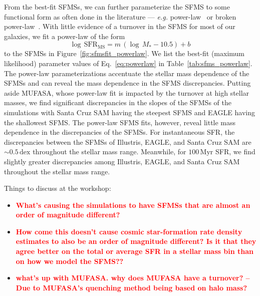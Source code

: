 \documentclass[preprint2,tighten]{aastex62}
\newcommand{\todo}[1]{{\bf \textcolor{red}{ #1}}}
\begin{document}
From the best-fit SFMSs, we can further 
parameterize the SFMS to some functional form as often done in the 
literature --- \emph{e.g.} power-law~\citep{speagle2014} or broken 
power-law~\citep{lee2015}. With little evidence of a turnover in the 
SFMS for most of our galaxies, we fit a power-law of the form 
\begin{equation} \label{eq:powerlaw}
\log\,\mathrm{SFR}_\mathrm{MS} = m\,(\log\,M_* - 10.5) + b
\end{equation}
to the SFMSs in Figure~\ref{fig:sfmsfit_powerlaw}. We list the best-fit 
(maximum likelihood) parameter values of Eq.~\ref{eq:powerlaw} in 
Table~\ref{tab:sfms_powerlaw}. The power-law parameterizations accentuate 
the stellar mass dependence of the SFMSs and can reveal the mass dependence 
in the SFMS discrepancies. Putting aside MUFASA, whose power-law fit is 
impacted by the turnover at high stellar masses, we find significant
discrepancies in the slopes of the SFMSs of the simulations with Santa Cruz 
SAM having the steepest SFMS and EAGLE having the shallowest SFMS. The 
power-law SFMS fits, however, reveal little 
mass dependence in the discrepancies of the SFMSs. For instantaneous SFR, 
the discrepancies between the SFMSs of Illustris, EAGLE, and Santa Cruz SAM are 
$\sim 0.5\,\mathrm{dex}$ throughout the stellar mass range. Meanwhile, 
for $100\,\mathrm{Myr}$ SFR, we find slightly
greater discrepancies among Illustris, EAGLE, and Santa Cruz SAM throughout
the stellar mass range.

Things to discuss at the workshop: 
\begin{itemize}
\item \todo{What's causing the simulations to have SFMSs that are almost an 
order of magnitude different?} 
\item \todo{How come this doesn't cause cosmic star-formation rate 
density estimates to also be an order of magnitude different? Is it that they agree better on the total or average SFR in a stellar mass bin than on how we model the SFMS??}
\item \todo{what's up with MUFASA. why does MUFASA have a turnover? -- 
Due to MUFASA's quenching method being based on halo mass?}
\end{itemize}
\end{document}
